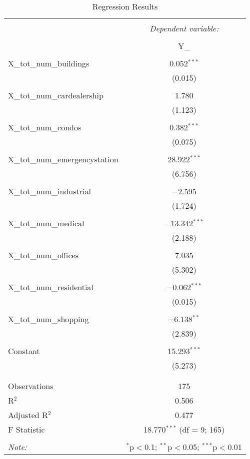 
\begin{table}[!htbp] \centering 
  \caption{Regression Results} 
  \label{} 
\begin{tabular}{@{\extracolsep{5pt}}lc} 
\\[-1.8ex]\hline 
\hline \\[-1.8ex] 
 & \multicolumn{1}{c}{\textit{Dependent variable:}} \\ 
\cline{2-2} 
\\[-1.8ex] & Y\_ \\ 
\hline \\[-1.8ex] 
 X\_tot\_num\_buildings & 0.052$^{***}$ \\ 
  & (0.015) \\ 
  & \\ 
 X\_tot\_num\_cardealership & 1.780 \\ 
  & (1.123) \\ 
  & \\ 
 X\_tot\_num\_condos & 0.382$^{***}$ \\ 
  & (0.075) \\ 
  & \\ 
 X\_tot\_num\_emergencystation & 28.922$^{***}$ \\ 
  & (6.756) \\ 
  & \\ 
 X\_tot\_num\_industrial & $-$2.595 \\ 
  & (1.724) \\ 
  & \\ 
 X\_tot\_num\_medical & $-$13.342$^{***}$ \\ 
  & (2.188) \\ 
  & \\ 
 X\_tot\_num\_offices & 7.035 \\ 
  & (5.302) \\ 
  & \\ 
 X\_tot\_num\_residential & $-$0.062$^{***}$ \\ 
  & (0.015) \\ 
  & \\ 
 X\_tot\_num\_shopping & $-$6.138$^{**}$ \\ 
  & (2.839) \\ 
  & \\ 
 Constant & 15.293$^{***}$ \\ 
  & (5.273) \\ 
  & \\ 
\hline \\[-1.8ex] 
Observations & 175 \\ 
R$^{2}$ & 0.506 \\ 
Adjusted R$^{2}$ & 0.477 \\ 
F Statistic & 18.770$^{***}$ (df = 9; 165) \\ 
\hline 
\hline \\[-1.8ex] 
\textit{Note:}  & \multicolumn{1}{r}{$^{*}$p$<$0.1; $^{**}$p$<$0.05; $^{***}$p$<$0.01} \\ 
\end{tabular} 
\end{table} 
